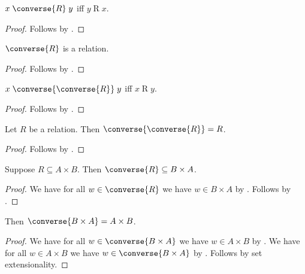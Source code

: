 \begin{proposition}\label{converse_iff}
    $x\mathrel{\converse{R}} y$ iff $y\mathrel{R} x$.
\end{proposition}
\begin{proof}
    Follows by .
\end{proof}


\begin{proposition}\label{converse_is_relation}
    $\converse{R}$ is a relation.
\end{proposition}
\begin{proof}
    Follows by .
\end{proof}


\begin{proposition}\label{converse_converse_iff}
    $x \mathrel{\converse{\converse{R}}} y$ iff $x\mathrel{R} y$.
\end{proposition}
\begin{proof}
    Follows by .
\end{proof}

\begin{proposition}\label{converse_converse_eq}
    Let $R$ be a relation.
    Then $\converse{\converse{R}} = R$.
\end{proposition}
\begin{proof}
    Follows by .
\end{proof}

\begin{proposition}\label{converse_type}
    Suppose $R\subseteq A\times B$.
    Then $\converse{R}\subseteq B\times A$.
\end{proposition}
\begin{proof}
    We have for all $w\in\converse{R}$ we have $w\in B\times A$
        by .
    Follows by .
\end{proof}

\begin{proposition}\label{converse_times}
    Then $\converse{B\times A} = A\times B$.
\end{proposition}
\begin{proof}
    We have for all $w\in\converse{B\times A}$ we have $w\in A\times B$
        by .
    We have for all $w\in A\times B$ we have $w\in\converse{B\times A}$
        by .
    Follows by set extensionality.
\end{proof}

